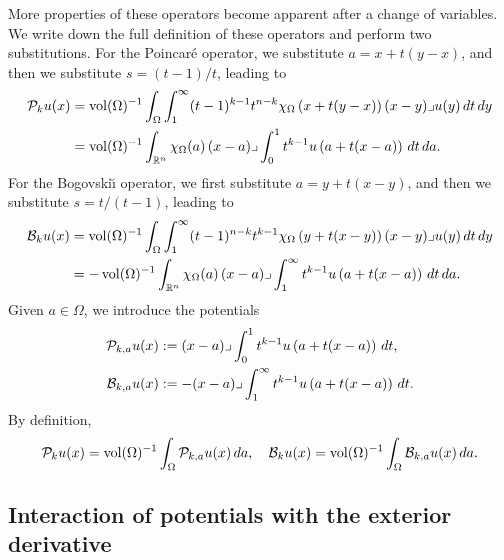 \documentclass[10pt,a4paper]{article}
\begin{document}
More properties of these operators become apparent after a change of variables. 
We write down the full definition of these operators and perform two substitutions.
For the Poincar\'e operator, we substitute $a = x + t(y-x)$, and then we substitute $s = (t-1)/t$,
leading to 
\begin{align*}
    {\mathcal P}_{k} u(x) 
    &= 
    \operatorname{vol}(\Omega)^{-1}
    \int_{\Omega} \int_{1}^\infty (t-1)^{k-1}t^{n-k} 
    \chi_{\Omega}\left(x+t(y-x)\right) 
    (x-y)\lrcorner u(y) \,dt\,dy 
    \\
    &=
    \operatorname{vol}(\Omega)^{-1}
    \int_{{\mathbb R}^{n}} \chi_{\Omega}(a) \,(x-a)\lrcorner \int_{0}^{1} t^{k-1} u\left(a+t(x-a)\right)\,dt\,da
    .
\end{align*}
For the Bogovski\u{\i} operator, we first substitute $a = y + t(x-y)$, and then we substitute $s = t/(t-1)$,
leading to 
\begin{align*}
    {\mathcal B}_{k} u(x) 
    &= 
    \operatorname{vol}(\Omega)^{-1}
    \int_{\Omega} \int_{1}^\infty (t-1)^{n-k}t^{k-1} 
    \chi_{\Omega}\left(y+t(x-y)\right) 
    (x-y)\lrcorner u(y) \,dt\,dy 
    \\
    &=
    - 
    \operatorname{vol}(\Omega)^{-1}
    \int_{{\mathbb R}^{n}} \chi_{\Omega}(a) \,(x-a)\lrcorner \int_{1}^\infty t^{k-1} u\left(a+t(x-a)\right)\,dt\,da
    .
\end{align*}
% 
Given $a \in \Omega$, we introduce the potentials 
\begin{align*}
    {\mathcal P}_{k,a} u(x) 
    &:= 
    (x-a)\lrcorner \int_{0}^{1} t^{k-1} u\left(a+t(x-a)\right)\,dt
    ,
    \\
    {\mathcal B}_{k,a} u(x) 
    &:= 
    - (x-a)\lrcorner \int_{1}^\infty t^{k-1} u\left(a+t(x-a)\right)\,dt
    .
\end{align*}
By definition,
\begin{align*}
    {\mathcal P}_{k} u(x) 
    =
    \operatorname{vol}(\Omega)^{-1}
    \int_{\Omega} {\mathcal P}_{k,a} u(x) \,da,
    \quad 
    {\mathcal B}_{k} u(x) 
    =
    \operatorname{vol}(\Omega)^{-1}
    \int_{\Omega} {\mathcal B}_{k,a} u(x) \,da
    .
\end{align*}




\subsection{Interaction of potentials with the exterior derivative}
\end{document}
